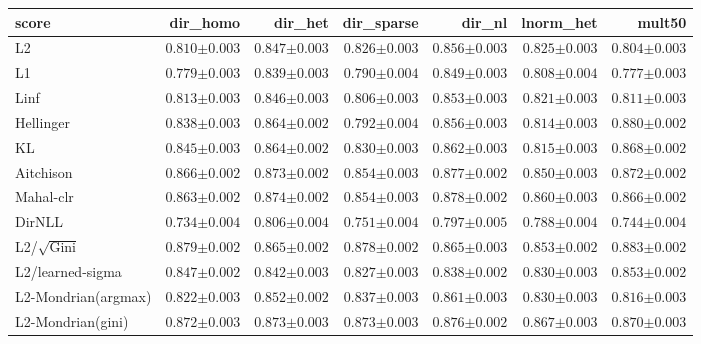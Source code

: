 \begin{tabular}{lrrrrrr}
\toprule
score & dir\_homo & dir\_het & dir\_sparse & dir\_nl & lnorm\_het & mult50 \\
\midrule
L2 & $0.810{\scriptstyle\pm0.003}$ & $0.847{\scriptstyle\pm0.003}$ & $0.826{\scriptstyle\pm0.003}$ & $0.856{\scriptstyle\pm0.003}$ & $0.825{\scriptstyle\pm0.003}$ & $0.804{\scriptstyle\pm0.003}$ \\
L1 & $0.779{\scriptstyle\pm0.003}$ & $0.839{\scriptstyle\pm0.003}$ & $0.790{\scriptstyle\pm0.004}$ & $0.849{\scriptstyle\pm0.003}$ & $0.808{\scriptstyle\pm0.004}$ & $0.777{\scriptstyle\pm0.003}$ \\
Linf & $0.813{\scriptstyle\pm0.003}$ & $0.846{\scriptstyle\pm0.003}$ & $0.806{\scriptstyle\pm0.003}$ & $0.853{\scriptstyle\pm0.003}$ & $0.821{\scriptstyle\pm0.003}$ & $0.811{\scriptstyle\pm0.003}$ \\
Hellinger & $0.838{\scriptstyle\pm0.003}$ & $0.864{\scriptstyle\pm0.002}$ & $0.792{\scriptstyle\pm0.004}$ & $0.856{\scriptstyle\pm0.003}$ & $0.814{\scriptstyle\pm0.003}$ & $0.880{\scriptstyle\pm0.002}$ \\
KL & $0.845{\scriptstyle\pm0.003}$ & $0.864{\scriptstyle\pm0.002}$ & $0.830{\scriptstyle\pm0.003}$ & $0.862{\scriptstyle\pm0.003}$ & $0.815{\scriptstyle\pm0.003}$ & $0.868{\scriptstyle\pm0.002}$ \\
Aitchison & $0.866{\scriptstyle\pm0.002}$ & $0.873{\scriptstyle\pm0.002}$ & $0.854{\scriptstyle\pm0.003}$ & $0.877{\scriptstyle\pm0.002}$ & $0.850{\scriptstyle\pm0.003}$ & $0.872{\scriptstyle\pm0.002}$ \\
Mahal-clr & $0.863{\scriptstyle\pm0.002}$ & $\mathbf{0.874}{\scriptstyle\pm0.002}$ & $0.854{\scriptstyle\pm0.003}$ & $\mathbf{0.878}{\scriptstyle\pm0.002}$ & $0.860{\scriptstyle\pm0.003}$ & $0.866{\scriptstyle\pm0.002}$ \\
DirNLL & $0.734{\scriptstyle\pm0.004}$ & $0.806{\scriptstyle\pm0.004}$ & $0.751{\scriptstyle\pm0.004}$ & $0.797{\scriptstyle\pm0.005}$ & $0.788{\scriptstyle\pm0.004}$ & $0.744{\scriptstyle\pm0.004}$ \\
L2/$\sqrt{\mathrm{Gini}}$ & $\mathbf{0.879}{\scriptstyle\pm0.002}$ & $0.865{\scriptstyle\pm0.002}$ & $\mathbf{0.878}{\scriptstyle\pm0.002}$ & $0.865{\scriptstyle\pm0.003}$ & $0.853{\scriptstyle\pm0.002}$ & $\mathbf{0.883}{\scriptstyle\pm0.002}$ \\
L2/learned-sigma & $0.847{\scriptstyle\pm0.002}$ & $0.842{\scriptstyle\pm0.003}$ & $0.827{\scriptstyle\pm0.003}$ & $0.838{\scriptstyle\pm0.002}$ & $0.830{\scriptstyle\pm0.003}$ & $0.853{\scriptstyle\pm0.002}$ \\
L2-Mondrian(argmax) & $0.822{\scriptstyle\pm0.003}$ & $0.852{\scriptstyle\pm0.002}$ & $0.837{\scriptstyle\pm0.003}$ & $0.861{\scriptstyle\pm0.003}$ & $0.830{\scriptstyle\pm0.003}$ & $0.816{\scriptstyle\pm0.003}$ \\
L2-Mondrian(gini) & $0.872{\scriptstyle\pm0.003}$ & $0.873{\scriptstyle\pm0.003}$ & $0.873{\scriptstyle\pm0.003}$ & $0.876{\scriptstyle\pm0.002}$ & $\mathbf{0.867}{\scriptstyle\pm0.003}$ & $0.870{\scriptstyle\pm0.003}$ \\
\bottomrule
\end{tabular}